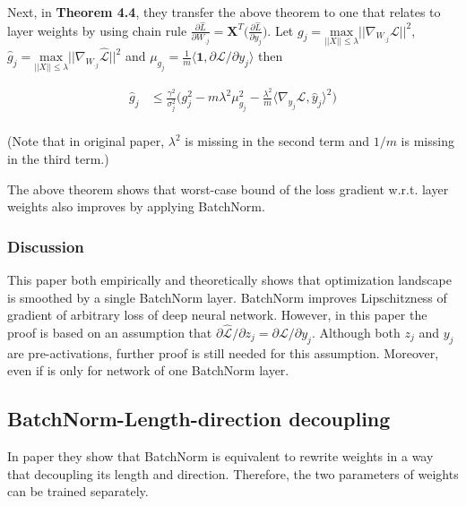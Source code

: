 \documentclass{article}
\begin{document}
Next, in \textbf{Theorem 4.4}, they transfer the above theorem to one that relates to layer weights by using chain rule $\frac{\partial\hat{L}}{\partial W_{.j}}=\textbf{X}^T\big(\frac{\partial\hat{L}}{\partial y_{j}}\big)$. Let $g_j=\underset{||X||\leq\lambda}{\mathrm{max}}\big|\big|\nabla_{W_{\cdot j}}\mathcal{L}\big|\big|^2$, $\hat{g}_j=\underset{||X||\leq\lambda}{\mathrm{max}}\big|\big|\nabla_{W_{\cdot j}}\hat{\mathcal{L}}\big|\big|^2$ and $\mu_{g_j}=\frac{1}{m}\langle\mathbf{1},\partial\mathcal{L}/\partial y_j\rangle$ then

\begin{align*}
	\hat{g}_j &\leq 
	\frac{\gamma^2}{\sigma_j^2}\Bigg(
	g_j^2 - m\lambda^2\mu^2_{g_j}-\frac{\lambda^2}{m}\langle\nabla_{y_j}\mathcal{L},\hat{y}_j\rangle^2
	\Bigg)\\
\end{align*}

(Note that in original paper, $\lambda^2$ is missing in the second term and $1/m$ is missing in the third term.)

The above theorem shows that worst-case bound of the loss gradient w.r.t. layer weights also improves by applying BatchNorm.

\subsubsection{Discussion}

This paper both empirically and theoretically shows that optimization landscape is smoothed by a single BatchNorm layer. BatchNorm improves Lipschitzness of gradient of arbitrary loss of deep neural network. However, in this paper the proof is based on an assumption that $\partial\hat{\mathcal{L}}/\partial z_j = \partial\mathcal{L}/\partial y_j$. Although both $z_j$ and $y_j$ are pre-activations, further proof is still needed for this assumption. Moreover, even if  is only for network of one BatchNorm layer.


\subsection{BatchNorm-Length-direction decoupling}

In paper \cite{decoupling} they show that BatchNorm is equivalent to rewrite weights in a way that decoupling its length and direction. Therefore, the two parameters of weights can be trained separately.
\end{document}
